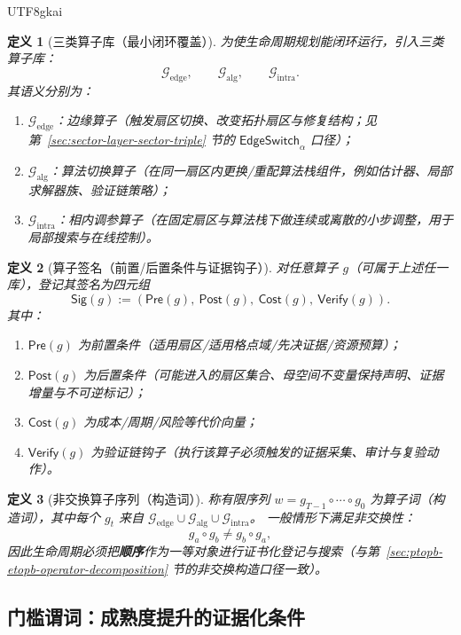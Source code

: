 \documentclass[12pt]{article}
\newtheorem{definition}{定义}[section]
\begin{document}
\begin{CJK*}{UTF8}{gkai}
\begin{definition}[三类算子库（最小闭环覆盖）]
为使生命周期规划能闭环运行，引入三类算子库：
\[
  \mathcal{G}_{\mathrm{edge}},\qquad
  \mathcal{G}_{\mathrm{alg}},\qquad
  \mathcal{G}_{\mathrm{intra}}.
\]
其语义分别为：
\begin{enumerate}
  \item $\mathcal{G}_{\mathrm{edge}}$：边缘算子（触发扇区切换、改变拓扑扇区与修复结构；见第~\ref{sec:sector-layer-sector-triple} 节的
    $\mathsf{EdgeSwitch}_\alpha$ 口径）；
  \item $\mathcal{G}_{\mathrm{alg}}$：算法切换算子（在同一扇区内更换/重配算法栈组件，例如估计器、局部求解器族、验证链策略）；
  \item $\mathcal{G}_{\mathrm{intra}}$：相内调参算子（在固定扇区与算法栈下做连续或离散的小步调整，用于局部搜索与在线控制）。
\end{enumerate}
\end{definition}

\begin{definition}[算子签名（前置/后置条件与证据钩子）]
对任意算子 $g$（可属于上述任一库），登记其签名为四元组
\[
  \mathsf{Sig}(g):=(\mathsf{Pre}(g),\ \mathsf{Post}(g),\ \mathsf{Cost}(g),\ \mathsf{Verify}(g)).
\]
其中：
\begin{enumerate}
  \item $\mathsf{Pre}(g)$ 为前置条件（适用扇区/适用格点域/先决证据/资源预算）；
  \item $\mathsf{Post}(g)$ 为后置条件（可能进入的扇区集合、母空间不变量保持声明、证据增量与不可逆标记）；
  \item $\mathsf{Cost}(g)$ 为成本/周期/风险等代价向量；
  \item $\mathsf{Verify}(g)$ 为验证链钩子（执行该算子必须触发的证据采集、审计与复验动作）。
\end{enumerate}
\end{definition}

\begin{definition}[非交换算子序列（构造词）]
称有限序列 $w=g_{T-1}\circ\cdots\circ g_0$ 为算子词（构造词），其中每个 $g_t$ 来自 $\mathcal{G}_{\mathrm{edge}}\cup\mathcal{G}_{\mathrm{alg}}
  \cup\mathcal{G}_{\mathrm{intra}}$。
一般情形下满足非交换性：
\[
  g_a\circ g_b \neq g_b\circ g_a,
\]
因此生命周期必须把\textbf{顺序}作为一等对象进行证书化登记与搜索（与第~\ref{sec:ptopb-etopb-operator-decomposition} 节的非交换构造口径一致）。
\end{definition}

\subsection{门槛谓词：成熟度提升的证据化条件}
\label{sec:lifecycle-gate-policy}


\end{CJK*}
\end{document}

